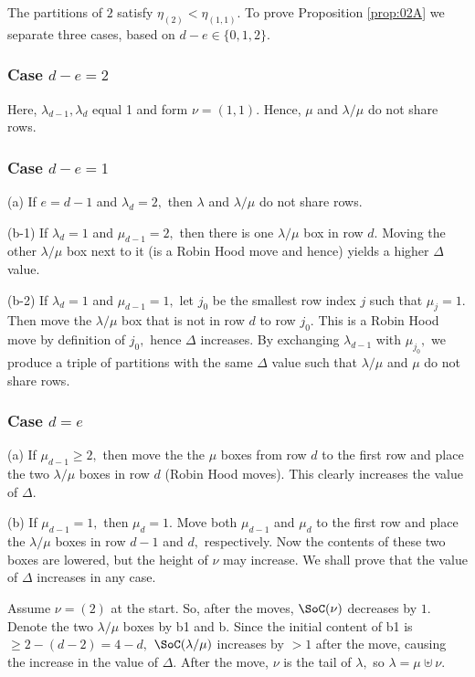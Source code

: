 \documentclass[12pt,dvipsnames,accepted=2016-08-18,a4paper,onecolumn]{quantumarticle}
\def\la{\lambda}
\def\la{\lambda}
\numberwithin{equation}{section}
\theoremstyle{definition}
\begin{document}
The partitions of $2$ satisfy $\eta_{(2)} < \eta_{(1,1)}$. 
To prove Proposition \ref{prop:02A} we separate three cases, based on $d-e\in\{0,1,2\}$.

\subsubsection{Case $d-e=2$}

Here, $\la_{d-1},\la_d$ equal 1 and form $\nu=(1,1)$. Hence, $\mu$ and $\la / \mu$ do not share rows.

\subsubsection{Case $d-e=1$}

(a) If $e = d-1$ and $\la_d=2,$ then $\la$ and $\la / \mu$ do not share rows.

(b-1) If $\la_d=1$ and $\mu_{d-1} = 2,$ then there is one $\la /\mu$ box in row $d.$ Moving the other $\la / \mu$ box next to it (is a Robin Hood move and hence) yields a higher $\Delta$ value.

(b-2)  If $\la_d=1$ and $\mu_{d-1} = 1,$ let $j_0$ be the smallest row index $j$ such that $\mu_j =1.$ Then move the $\la /\mu$ box that is not in row $d$ to row $j_0.$ This is a Robin Hood move by definition of $j_0,$ hence $\Delta$ increases. By exchanging $\la_{d-1}$ with $\mu_{j_0},$ we produce a triple of partitions with the same $\Delta$ value such that $\la / \mu$ and $\mu$ do not share rows.

\subsubsection{Case $d=e$}
(a) If $\mu_{d-1}\geq 2,$ then move the the $\mu$ boxes from row $d$ to the first row and place the two $\la / \mu$ boxes in row $d$ (Robin Hood moves). This clearly increases the value  of $\Delta.$

(b) If $\mu_{d-1}=1,$ then $\mu_d=1.$ Move both $\mu_{d-1}$ and $\mu_d$ to the first row and place the $\la / \mu$ boxes in row $d-1$ and $d,$ respectively.
Now the contents of these two boxes are lowered, but the height of $\nu$ may increase. We shall prove that the value of $\Delta$ increases in any case.

Assume $\nu = (2)$ at the start. So, after the moves, $\SoC(\nu)$ decreases by $1.$
Denote the two $\la/\mu$ boxes by b1 and b.
Since the initial content of b1 is $\geq 2-(d-2)=4-d,$ $\SoC(\la/\mu)$ increases by $>1$ after the move, causing
the increase in the value of $\Delta.$ 
After the move, $\nu$ is the tail of $\la,$ so $\la = \mu \uplus \nu.$
\end{document}
